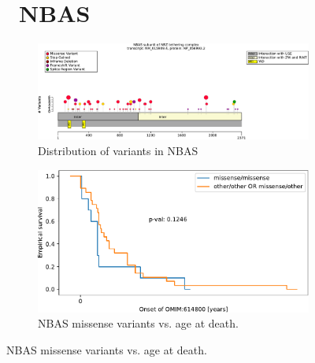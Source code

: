 \begin{figure}[htbp]
\section*{ NBAS}
\centering
\begin{subfigure}[b]{0.5\textwidth}
\centering
\includegraphics[width=\textwidth]{ img/NBAS_protein_diagram.pdf} 
\captionsetup{justification=raggedright,singlelinecheck=false}
\caption{Distribution of variants in NBAS}
\end{subfigure}
\begin{subfigure}[b]{0.48\textwidth}
\centering
\includegraphics[width=\textwidth]{ img/NBAS_stats.pdf} 
\captionsetup{justification=raggedright,singlelinecheck=false}
\caption{NBAS missense variants vs. age at death.}
\end{subfigure}

\vspace{2em}


\end{figure}
